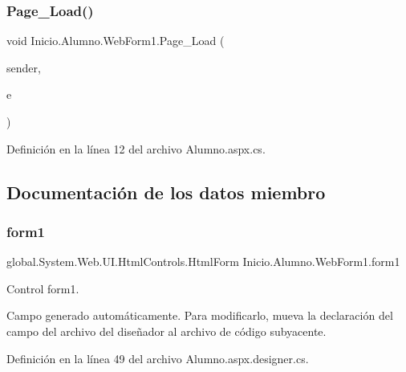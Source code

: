\subsubsection{\texorpdfstring{Page\_Load()}{Page\_Load()}}
{\footnotesize\ttfamily void Inicio.\+Alumno.\+Web\+Form1.\+Page\+\_\+\+Load (\begin{DoxyParamCaption}\item[{object}]{sender,  }\item[{Event\+Args}]{e }\end{DoxyParamCaption})\hspace{0.3cm}{\ttfamily [protected]}}



Definición en la línea 12 del archivo Alumno.\+aspx.\+cs.


\begin{DoxyCode}{0}

\end{DoxyCode}


\subsection{Documentación de los datos miembro}
\mbox{\label{classInicio_1_1Alumno_1_1WebForm1_a2137374d61434e8392c74d095f0516ba}} 
\subsubsection{\texorpdfstring{form1}{form1}}
{\footnotesize\ttfamily global.\+System.\+Web.\+U\+I.\+Html\+Controls.\+Html\+Form Inicio.\+Alumno.\+Web\+Form1.\+form1\hspace{0.3cm}{\ttfamily [protected]}}



Control form1. 

Campo generado automáticamente. Para modificarlo, mueva la declaración del campo del archivo del diseñador al archivo de código subyacente. 

Definición en la línea 49 del archivo Alumno.\+aspx.\+designer.\+cs.

\mbox{\label{classInicio_1_1Alumno_1_1WebForm1_a33b42d1a036679a4105a9139551089fd}} 
